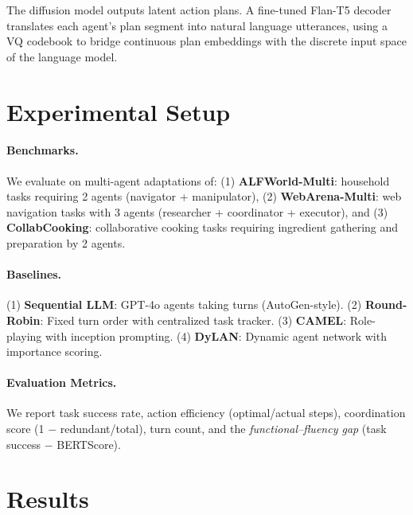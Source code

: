 \documentclass[11pt]{article}
\begin{document}
The diffusion model outputs latent action plans. A fine-tuned Flan-T5 decoder translates each agent's plan segment into natural language utterances, using a VQ codebook to bridge continuous plan embeddings with the discrete input space of the language model.


\section{Experimental Setup}
\label{sec:setup}

\paragraph{Benchmarks.} We evaluate on multi-agent adaptations of: (1) \textbf{ALFWorld-Multi}: household tasks requiring 2 agents (navigator + manipulator), (2) \textbf{WebArena-Multi}: web navigation tasks with 3 agents (researcher + coordinator + executor), and (3) \textbf{CollabCooking}: collaborative cooking tasks requiring ingredient gathering and preparation by 2 agents.

\paragraph{Baselines.} (1) \textbf{Sequential LLM}: GPT-4o agents taking turns (AutoGen-style). (2) \textbf{Round-Robin}: Fixed turn order with centralized task tracker. (3) \textbf{CAMEL}: Role-playing with inception prompting. (4) \textbf{DyLAN}: Dynamic agent network with importance scoring.

\paragraph{Evaluation Metrics.} We report task success rate, action efficiency (optimal/actual steps), coordination score (1 $-$ redundant/total), turn count, and the \textit{functional--fluency gap} (task success $-$ BERTScore).


\section{Results}
\label{sec:results}
\end{document}
